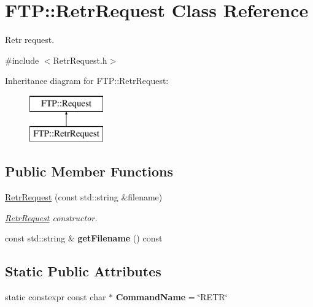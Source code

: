 \hypertarget{classFTP_1_1RetrRequest}{}\section{F\+T\+P\+:\+:Retr\+Request Class Reference}
\label{classFTP_1_1RetrRequest}


Retr request.  




{\ttfamily \#include $<$Retr\+Request.\+h$>$}

Inheritance diagram for F\+T\+P\+:\+:Retr\+Request\+:\begin{figure}[H]
\begin{center}
\leavevmode
\includegraphics[height=2.000000cm]{classFTP_1_1RetrRequest}
\end{center}
\end{figure}
\subsection*{Public Member Functions}
\begin{DoxyCompactItemize}
\item 
\hyperlink{classFTP_1_1RetrRequest_a97bf717da1cf5ef47cd08d09db7fcb77}{Retr\+Request} (const std\+::string \&filename)
\begin{DoxyCompactList}\small\item\em \hyperlink{classFTP_1_1RetrRequest}{Retr\+Request} constructor. \end{DoxyCompactList}\item 
\hypertarget{classFTP_1_1RetrRequest_a3c558dccb6b1efac1138e31c4957c524}{}const std\+::string \& {\bfseries get\+Filename} () const \label{classFTP_1_1RetrRequest_a3c558dccb6b1efac1138e31c4957c524}

\end{DoxyCompactItemize}
\subsection*{Static Public Attributes}
\begin{DoxyCompactItemize}
\item 
\hypertarget{classFTP_1_1RetrRequest_ad28da02570e40fac7f7ae3136b71acdf}{}static constexpr const char $\ast$ {\bfseries Command\+Name} = \char`\"{}R\+E\+T\+R\char`\"{}\label{classFTP_1_1RetrRequest_ad28da02570e40fac7f7ae3136b71acdf}

\end{DoxyCompactItemize}


